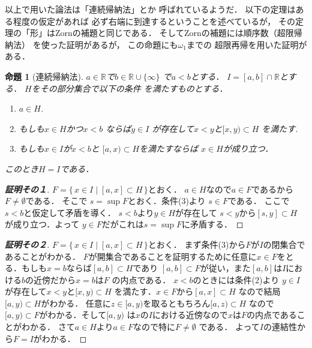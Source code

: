 \documentclass[leqno, a4paper, 12pt]{jsarticle}
\newtheorem{prop}[thm]{命題}
\newcommand{\rr}{\mathbb{R}}
\begin{document}
以上で用いた論法は「連続帰納法」とか
呼ばれているようだ．
以下の定理はある程度の仮定があれば
必ず右端に到達するということを述べているが，
その定理の「形」はZornの補題と同じである．
そしてZornの補題には順序数（超限帰納法）
を使った証明があるが，
この命題にも$\omega_{1}$までの
超限再帰を用いた証明がある．
\begin{prop}[連続帰納法]
$a\in \rr$で$b\in \rr\cup\{\infty\}$
で$a<b$とする．
$I=[a, b]\cap \rr$とする．
$H$をその部分集合で以下の条件
を満たすものとする．
\begin{enumerate}
\item 
$a\in H$. 
\item 
もしも$x\in H$かつ$x<b$
ならば$y\in I$
が存在して$x<y$と$[x, y)\subset H$
を満たす. 
\item 
もしも$x\in I$が$x<b$と
$[a, x)\subset H$を満たすならば
$x\in H$が成り立つ． 
\end{enumerate}
このとき$H=I$である．
\end{prop}
\begin{proof}[\textbf{証明その１}]
$F=\{\, x\in I\mid [a, x]\subset H\, \}$とおく．
$a\in H$なので$a\in F$であるから$F\neq \emptyset$である．
そこで
$s=\sup F$とおく．条件(3)より
$s\in F$である．
ここで$s<b$と仮定して矛盾を導く．
$s<b$より$y\in H$が存在して
$s<y$から$[s, y]\subset H$
が成り立つ．よって
$y\in F$だがこれは$s=\sup F$に矛盾する．
\end{proof}
\begin{proof}[\textbf{証明その２}]
$F=\{\, x\in I\mid [a, x]\subset H\, \}$とおく．
まず条件(3)から$F$が$I$の閉集合であることがわかる．
$F$が開集合であることを証明するために任意に$x\in F$をとる．もしも$x=b$ならば$[a, b]\subset H$であり
$[a, b]\subset F$が従い，また$[a, b]$は$I$における$b$の近傍だから$x=b$は$F$
の内点である．
$x<b$のときには条件(2)より
$y\in I$が存在して$x<y$と$[x, y)\subset H$
を満たす．$x\in F$から$[a, x]\subset H$
なので結局$[a, y)\subset H$がわかる．
任意に$z\in [a, y)$を取るともちろん$[a, z)\subset H$
なので$[a, y)\subset F$がわかる．そして$[a, y)$
は$x$の$I$における近傍なので$x$は$F$の内点であることがわかる．
さて$a\in H$より$a\in F$なので特に$F\neq \emptyset$
である．
よって$I$の連結性から$F=I$がわかる．
\end{proof}
\end{document}
